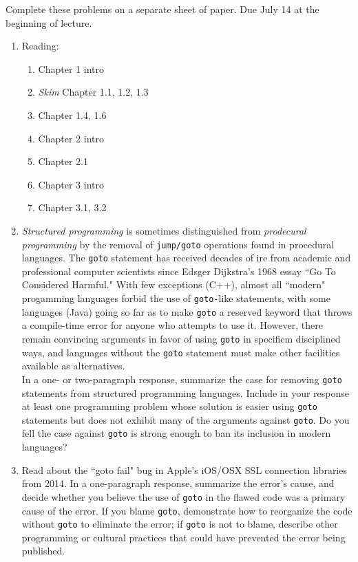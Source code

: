 \documentclass[9pt]{article}
\begin{document}
\noindent Complete these problems on a separate sheet of paper. Due July 14 at
the beginning of lecture.
\begin{enumerate}
   \item Reading:

         \begin{enumerate}
            \item Chapter 1 intro
            \item \textit{Skim} Chapter 1.1, 1.2, 1.3
            \item Chapter 1.4, 1.6
            \item Chapter 2 intro
            \item Chapter 2.1
            \item Chapter 3 intro
            \item Chapter 3.1, 3.2
         \end{enumerate}
   \item \textit{Structured programming} is sometimes distinguished from
         \textit{prodecural programming} by the removal of \verb|jump/goto|
         operations found in procedural languages. The \verb|goto| statement has
         received decades of ire from academic and professional computer
         scientists since Edsger Dijkstra's 1968 essay ``Go To Considered
         Harmful." With few exceptions (C++), almost all ``modern" progamming
         languages forbid the use of \verb|goto-|like statements, with some
         languages (Java) going so far as to make \verb|goto| a reserved keyword
         that throws a compile-time error for anyone who attempts to use it.
         However, there remain convincing arguments in favor of using
         \verb|goto| in specificm disciplined ways, and languages without the
         \verb|goto| statement must make other facilities available as 
         alternatives. \\

         In a one- or two-paragraph response, summarize the case for removing
         \verb|goto| statements from structured programming languages. Include
         in your response at least one programming problem whose solution is
         easier using \verb|goto| statements but does not exhibit many of the
         arguments against \verb|goto|. Do you fell the case against \verb|goto|
         is strong enough to ban its inclusion in modern languages?
   \item Read about the ``goto fail" bug in Apple's iOS/OSX SSL connection
         libraries from 2014. In a one-paragraph response, summarize the error's
         cause, and decide whether you believe the use of \verb|goto| in the
         flawed code was a primary cause of the error. If you blame \verb|goto|,
         demonstrate how to reorganize the code without \verb|goto| to eliminate
         the error; if \verb|goto| is not to blame, describe other programming
         or cultural practices that could have prevented the error being
         published.


\end{enumerate}
\end{document}
